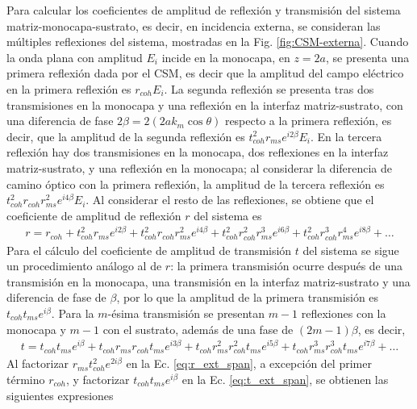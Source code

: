Para calcular los coeficientes de amplitud de reflexión y transmisión del sistema matriz-monocapa-sustrato, es decir, en incidencia externa, se consideran las múltiples reflexiones del sistema, mostradas en la Fig. \ref{fig:CSM-externa}. Cuando la onda plana con amplitud $E_i$ incide en la monocapa, en $z=2a$, se presenta una primera reflexión dada por el CSM, es decir que la amplitud del campo eléctrico en la primera reflexión es $r_{coh}E_i$. La segunda reflexión se presenta tras dos transmisiones en la monocapa y una reflexión en la interfaz matriz-sustrato, con una diferencia de fase $2\beta=2(2ak_m\cos\theta)$ respecto a la primera reflexión, es decir, que la amplitud de la segunda reflexión es $t_{coh}^2r_{ms}e^{i2\beta}E_i$. En la tercera reflexión hay dos transmisiones en la monocapa, dos reflexiones en la interfaz matriz-sustrato, y una reflexión en la monocapa; al considerar la diferencia de camino óptico con la primera reflexión, la amplitud de la tercera reflexión es $t_{coh}^2r_{coh}r_{ms}^2e^{i4\beta}E_i$. Al considerar el resto de las reflexiones, se obtiene que el coeficiente de amplitud de reflexión $r$ del sistema es 
%
	\begin{align}
	r = r_{coh} +
		 t_{coh}^2r_{ms}e^{i2\beta}+
		 t_{coh}^2r_{coh}r_{ms}^2e^{i4\beta}+
		 t_{coh}^2r_{coh}^2r_{ms}^3e^{i6\beta}+
		 t_{coh}^2r_{coh}^3r_{ms}^4e^{i8\beta}+\ldots
	\label{eq:r_ext_span}
	\end{align}
%
Para el cálculo del coeficiente de amplitud de transmisión $t $ del sistema se sigue un procedimiento análogo al de $r$: la primera transmisión ocurre después de una transmisión en la monocapa, una transmisión en la interfaz matriz-sustrato y una diferencia de fase de $\beta$, por lo que la amplitud de la primera transmisión es $t_{coh}t_{ms}e^{i\beta}$. Para la $m$-ésima transmisión se presentan $m-1$ reflexiones con la monocapa y $m-1$ con el sustrato, además de una fase de $(2m-1)\beta$, es decir,
%
	\begin{align}
	t = t_{coh}t_{ms}e^{i\beta} +
		t_{coh}r_{ms}r_{coh}t_{ms}e^{i3\beta}+
		t_{coh}r_{ms}^2r_{coh}^2t_{ms}e^{i5\beta}+	
		t_{coh}r_{ms}^3r_{coh}^3t_{ms}e^{i7\beta}+ \ldots					
	\label{eq:t_ext_span}
	\end{align}\noindent
%	
Al factorizar $r_{ms}t_{coh}^2e^{2i\beta}$ en la Ec. \eqref{eq:r_ext_span}, a excepción del primer término $r_{coh}$, y factorizar $t_{coh}t_{ms}e^{i\beta}$ en la Ec. \eqref{eq:t_ext_span}, se obtienen las siguientes expresiones
